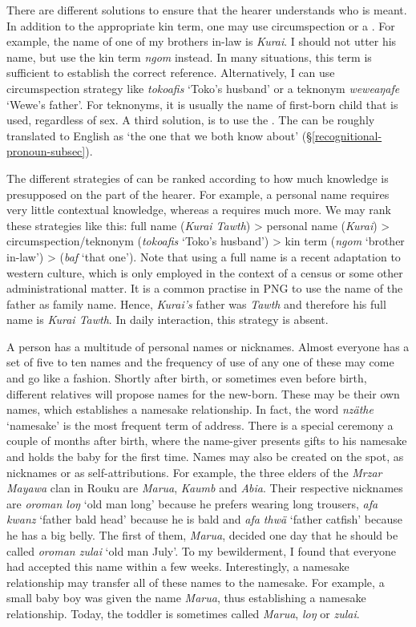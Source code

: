 There are different solutions to ensure that the hearer understands who is meant. In addition to the appropriate kin term, one may use circumspection or a  . For example, the name of one of my brothers in-law is \emph{Kurai}. I should not utter his name, but use the kin term \emph{ngom} instead. In many situations, this term is sufficient to establish the correct reference. Alternatively, I can use circumspection strategy like \emph{tokoafis} `Toko's husband' or a teknonym \emph{weweaŋafe} `Wewe's father'. For teknonyms, it is usually the name of first-born child that is used, regardless of sex. A third solution, is to use the  . The   can be roughly translated to English as `the one that we both know about' (\S\ref{recognitional-pronoun-subsec}).

The different strategies of  can be ranked according to how much knowledge is presupposed on the part of the hearer. For example, a personal name requires very little contextual knowledge, whereas a   requires much more. We may rank these strategies like this: full name (\emph{Kurai Tawth}) > personal name (\emph{Kurai}) > circumspection/teknonym (\emph{tokoafis} `Toko's husband') > kin term (\emph{ngom} `brother in-law') >  (\emph{baf} `that one'). Note that using a full name is a recent adaptation to western culture, which is only employed in the context of a census or some other administrational matter. It is a common practise in PNG to use the name of the father as family name. Hence, \emph{Kurai's} father was \emph{Tawth} and therefore his full name is \emph{Kurai Tawth}. In daily interaction, this strategy is absent.

A person has a multitude of personal names or nicknames. Almost everyone has a set of five to ten names and the frequency of use of any one of these may come and go like a fashion. Shortly after birth, or sometimes even before birth, different relatives will propose names for the new-born. These may be their own names, which establishes a namesake relationship. In fact, the word \emph{nzäthe} `namesake' is the most frequent term of address. There is a special ceremony a couple of months after birth, where the name-giver presents gifts to his namesake and holds the baby for the first time. Names may also be created on the spot, as nicknames or as self-attributions. For example, the three elders of the \emph{Mrzar Mayawa} clan in Rouku are \emph{Marua}, \emph{Kaumb} and \emph{Abia}. Their respective nicknames are \emph{oroman loŋ} `old man long' because he prefers wearing long trousers, \emph{afa kwanz} `father bald head' because he is bald and \emph{afa thwä} `father catfish' because he has a big belly. The first of them, \emph{Marua}, decided one day that he should be called \emph{oroman zulai} `old man July'. To my bewilderment, I found that everyone had accepted this name within a few weeks. Interestingly, a namesake relationship may transfer all of these names to the namesake. For example, a small baby boy was given the name \emph{Marua}, thus establishing a namesake relationship. Today, the toddler is sometimes called \emph{Marua}, \emph{loŋ} or \emph{zulai}.

